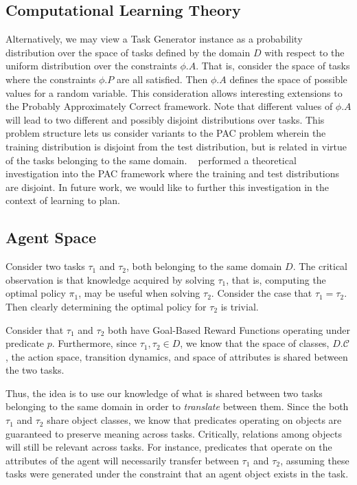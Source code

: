 \documentclass[11pt]{article}
\begin{document}
\subsection{Computational Learning Theory}
Alternatively, we may view a Task Generator instance as a probability distribution over the space of tasks defined by the domain $D$ with respect to the uniform distribution over the constraints $\phi.A$. That is, consider the space of tasks where the constraints $\phi.P$ are all satisfied. Then $\phi.A$ defines the space of possible values for a random variable. This consideration allows interesting extensions to the Probably Approximately Correct framework. Note that different values of $\phi.A$ will lead to two different and possibly disjoint distributions over tasks. This problem structure lets us consider variants to the PAC problem wherein the training distribution is disjoint from the test distribution, but is related in virtue of the tasks belonging to the same domain. ~\cite{baxter2000model} performed a theoretical investigation into the PAC framework where the training and test distributions are disjoint. In future work, we would like to further this investigation in the context of learning to plan.

\subsection{Agent Space}
Consider two tasks $\tau_1$ and $\tau_2$, both belonging to the same domain $D$. The critical observation is that knowledge acquired by solving $\tau_1$, that is, computing the optimal policy $\pi_1$, may be useful when solving $\tau_2$. Consider the case that $\tau_1 = \tau_2$. Then clearly determining the optimal policy for $\tau_2$ is trivial.

Consider that $\tau_1$ and $\tau_2$ both have Goal-Based Reward Functions operating under predicate $p$. Furthermore, since $\tau_1, \tau_2 \in D$, we know that the space of classes, $D.\mathcal{C}$, the action space, transition dynamics, and space of attributes is shared between the two tasks.

Thus, the idea is to use our knowledge of what is shared between two tasks belonging to the same domain in order to {\it translate} between them. Since the both $\tau_1$ and $\tau_2$ share object classes, we know that predicates operating on objects are guaranteed to preserve meaning across tasks. Critically, relations among objects will still be relevant across tasks. For instance, predicates that operate on the attributes of the agent will necessarily transfer between $\tau_1$ and $\tau_2$, assuming these tasks were generated under the constraint that an agent object exists in the task.
\end{document}
